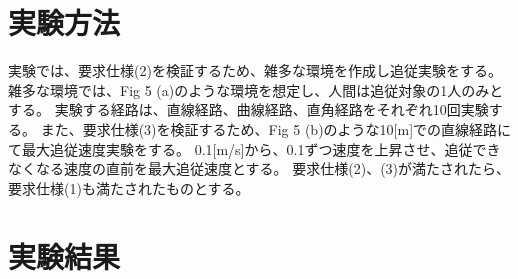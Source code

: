 \section{実験方法}
実験では、要求仕様(2)を検証するため、雑多な環境を作成し追従実験をする。
雑多な環境では、Fig 5 (a)のような環境を想定し、人間は追従対象の1人のみとする。
実験する経路は、直線経路、曲線経路、直角経路をそれぞれ10回実験する。
また、要求仕様(3)を検証するため、Fig 5 (b)のような10[m]での直線経路にて最大追従速度実験をする。
0.1[m/s]から、0.1ずつ速度を上昇させ、追従できなくなる速度の直前を最大追従速度とする。
要求仕様(2)、(3)が満たされたら、要求仕様(1)も満たされたものとする。

\section{実験結果}
